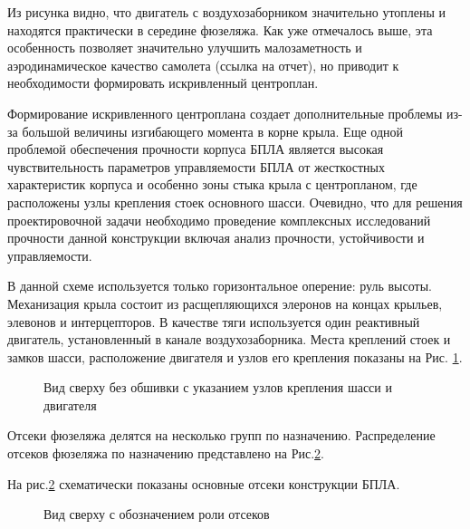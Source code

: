 Из рисунка видно, что двигатель с воздухозаборником значительно утоплены и находятся практически в середине фюзеляжа. Как уже отмечалось выше, эта особенность позволяет значительно улучшить малозаметность и аэродинамическое качество самолета (ссылка на отчет), но приводит к необходимости формировать искривленный центроплан. 

Формирование искривленного центроплана создает дополнительные проблемы из-за большой величины изгибающего момента в корне крыла. Еще одной проблемой обеспечения прочности корпуса БПЛА является высокая чувствительность параметров управляемости БПЛА от жесткостных характеристик корпуса и особенно зоны стыка крыла с центропланом, где расположены узлы крепления стоек основного шасси. Очевидно, что для решения проектировочной задачи необходимо проведение комплексных исследований прочности данной конструкции включая анализ прочности, устойчивости и управляемости. 

В данной схеме используется только горизонтальное оперение: руль высоты. Механизация крыла состоит из расщепляющихся элеронов на концах крыльев, элевонов и интерцепторов. В качестве тяги используется один реактивный двигатель, установленный в канале воздухозаборника. Места креплений стоек и замков шасси, расположение двигателя и узлов его крепления показаны на Рис. \ref{fig:BPS_Catia_Top_WithoutSkin}. 


\begin{figure}[H]
\centering
\def\svgwidth{0.9\textwidth}

\caption{Вид сверху без обшивки с указанием узлов крепления шасси и двигателя}
\label{fig:BPS_Catia_Top_WithoutSkin}
\end{figure}

Отсеки фюзеляжа делятся на несколько групп по назначению. Распределение отсеков фюзеляжа по назначению представлено на Рис.\ref{fig:BPS_Catia_Top_PartRoles}. 

На рис.\ref{fig:BPS_Catia_Top_PartRoles} схематически показаны основные отсеки конструкции БПЛА. 

\begin{figure}[H]
\centering
\def\svgwidth{0.9\textwidth}

\caption{Вид сверху с обозначением роли отсеков}
\label{fig:BPS_Catia_Top_PartRoles}
\end{figure}











